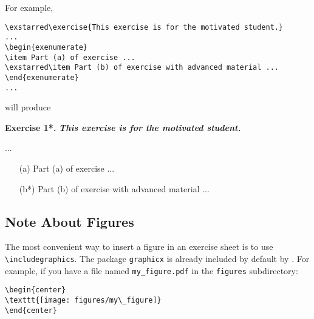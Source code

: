\documentclass[11pt,a4paper]{article}
\begin{document}

For example,
\begin{pkgverbatim}
\begin{verbatim}
\exstarred\exercise{This exercise is for the motivated student.}
...
\begin{exenumerate}
\item Part (a) of exercise ...
\exstarred\item Part (b) of exercise with advanced material ...
\end{exenumerate}
...
\end{verbatim}
\end{pkgverbatim}
will produce
\begin{pkgverbatim}[0mm]
  {\bf Exercise 1*.} \hspace*{2mm} {\em\bfseries This exercise is for the motivated student.}
  \par\medskip ...
  \par
  \begin{enumerate}
  \item[(a)] Part (a) of exercise ...
  \item[(b*)] Part (b) of exercise with advanced material ...
  \end{enumerate}
\end{pkgverbatim}


\subsection{Note About Figures}

The most convenient way to insert a figure in an exercise sheet is to use
\verb|\includegraphics|. The package \texttt{graphicx} is already included by default by
\ethuebung{}. For example, if you have a file named \verb|my_figure.pdf| in the
\verb|figures| subdirectory:
\begin{pkgverbatim}
\begin{verbatim}
\begin{center}
\texttt{[image: figures/my\_figure]}
\end{center}
\end{verbatim}
\end{pkgverbatim}
\end{document}
